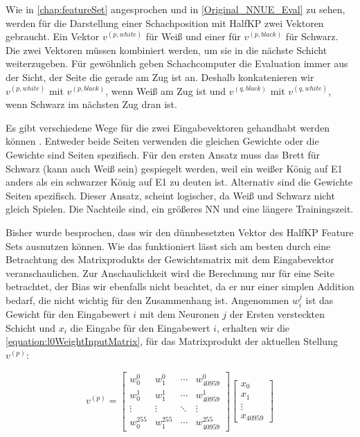 Wie in \autoref{chap:featureSet} angesprochen und in \autoref{Original_NNUE_Eval} zu sehen, werden für die Darstellung einer Schachposition mit HalfKP zwei Vektoren gebraucht. Ein Vektor $v^{(p,white)}$ für Weiß und einer für $v^{(p,black)}$ für Schwarz. Die zwei Vektoren müssen kombiniert werden, um sie in die nächste Schicht weiterzugeben. Für gewöhnlich geben Schachcomputer die Evaluation immer aus der Sicht, der Seite die gerade am Zug ist an. Deshalb konkatenieren wir $v^{(p,white)}$ mit $v^{(p,black)}$, wenn Weiß am Zug ist und $v^{(q,black)}$ mit $v^{(q,white)}$, wenn Schwarz im nächsten Zug dran ist.

Es gibt verschiedene Wege für die zwei Eingabevektoren gehandhabt werden können \cite{StockfishNNUE}. Entweder beide Seiten verwenden die gleichen Gewichte oder die Gewichte sind Seiten spezifisch. Für den ersten Ansatz muss das Brett für Schwarz (kann auch Weiß sein) gespiegelt werden, weil ein weißer König auf E1 anders als ein schwarzer König auf E1 zu deuten ist. Alternativ sind die Gewichte Seiten spezifisch. Dieser Ansatz, scheint logischer, da Weiß und Schwarz nicht gleich Spielen. Die Nachteile sind, ein größeres \ac{NN} und eine längere Trainingszeit.

Bisher wurde besprochen, dass wir den dünnbesetzten Vektor des HalfKP Feature Sets ausnutzen können. Wie das funktioniert lässt sich am besten durch eine Betrachtung des Matrixprodukts der Gewichtsmatrix mit dem Eingabevektor veranschaulichen. Zur Anschaulichkeit wird die Berechnung nur für eine Seite betrachtet, der Bias wir ebenfalls nicht beachtet, da er nur einer simplen Addition bedarf, die nicht wichtig für den Zusammenhang ist. Angenommen $w_{i}^{j}$ ist das Gewicht für den Eingabewert $i$ mit dem Neuronen $j$ der Ersten versteckten Schicht und $x_{i}$ die Eingabe für den Eingabewert $i$, erhalten wir die \autoref{equation:l0WeightInputMatrix}, für das Matrixprodukt der aktuellen Stellung $v^{(p)}$:

\begin{equation}
  v^{(p)}=\begin{bmatrix}
    w_{0}^{0}   & w_{1}^{0}   & \cdots & w_{40959}^{0}   \\
    w_{0}^{1}   & w_{1}^{1}   & \cdots & w_{40959}^{1}   \\
    \vdots      & \vdots      & \ddots & \vdots          \\
    w_{0}^{255} & w_{1}^{255} & \cdots & w_{40959}^{255}
  \end{bmatrix} \begin{bmatrix}
    x_{0}  \\
    x_{1}  \\
    \vdots \\
    x_{40959}
  \end{bmatrix}
  \label{equation:l0WeightInputMatrix}
\end{equation}

